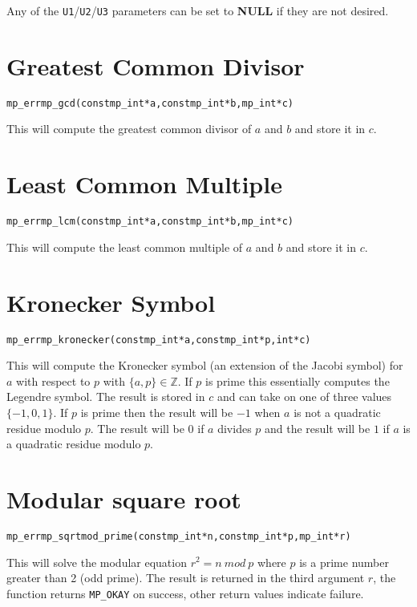 \documentclass[synpaper]{book}
\def\mod{{\mathit\ mod\ }}
\begin{document}
Any of the \texttt{U1}/\texttt{U2}/\texttt{U3} parameters can be set to \textbf{NULL} if they are not desired.

\section{Greatest Common Divisor}
\begin{alltt}
mp_err mp_gcd (const mp_int *a, const mp_int *b, mp_int *c)
\end{alltt}
This will compute the greatest common divisor of $a$ and $b$ and store it in $c$.

\section{Least Common Multiple}
\begin{alltt}
mp_err mp_lcm (const mp_int *a, const mp_int *b, mp_int *c)
\end{alltt}
This will compute the least common multiple of $a$ and $b$ and store it in $c$.


\section{Kronecker Symbol}
\begin{alltt}
mp_err mp_kronecker (const mp_int *a, const mp_int *p, int *c)
\end{alltt}
This will compute the Kronecker symbol (an extension of the Jacobi symbol) for $a$ with respect to $p$ with $\lbrace a, p \rbrace \in \mathbb{Z}$.  If $p$ is prime this essentially computes the Legendre
symbol.  The result is stored in $c$ and can take on one of three values $\lbrace -1, 0, 1 \rbrace$.  If $p$ is prime
then the result will be $-1$ when $a$ is not a quadratic residue modulo $p$.  The result will be $0$ if $a$ divides $p$
and the result will be $1$ if $a$ is a quadratic residue modulo $p$.


\section{Modular square root}
\begin{alltt}
mp_err mp_sqrtmod_prime(const mp_int *n, const mp_int *p, mp_int *r)
\end{alltt}

This will solve the modular equation $r^2 = n \mod p$ where $p$ is a prime number greater than 2 (odd prime).
The result is returned in the third argument $r$, the function returns \texttt{MP\_OKAY} on success,
other return values indicate failure.
\end{document}
